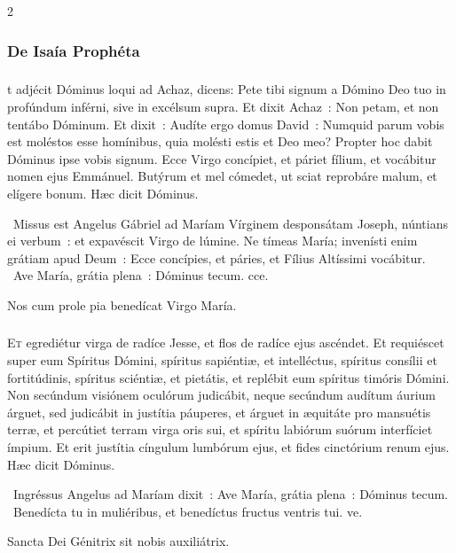 \documentclass[9pt,twoside]{extarticle}
\begin{document}
\begin{multicols}{2}
{{\subsubsection*{\center De Isaía Prophéta}
\subsubsection*{\center {}}
t adjécit Dóminus loqui ad Achaz, dicens:
Pete tibi signum a Dómino Deo tuo in profúndum inférni, sive in excélsum supra.
Et dixit Achaz~: Non petam, et non tentábo Dóminum.
Et dixit~: Audíte ergo domus David~: Numquid parum vobis est moléstos esse homínibus, quia molésti estis et Deo meo?
Propter hoc dabit Dóminus ipse vobis signum. Ecce Virgo concípiet, et páriet fílium, et vocábitur nomen ejus Emmánuel.
Butýrum et mel cómedet, ut sciat reprobáre malum, et elígere bonum. Hæc dicit Dóminus.

\begin{tightlist}{}
\item {}~Missus est Angelus Gábriel ad Maríam Vírginem desponsátam Joseph, núntians ei verbum~: et expavéscit Virgo de lúmine. Ne tímeas María; invenísti enim grátiam apud Deum~: \textred{*} Ecce concípies, et páries, et Fílius Altíssimi vocábitur.  ~Ave María, grátia plena~: Dóminus tecum. cce.
\item {\small {} Nos cum prole pia benedícat Virgo María.}
\end{tightlist}

\subsubsection*{}
\lettrine{E}t egrediétur virga de radíce Jesse, et flos de radíce ejus ascéndet.
Et requiéscet super eum Spíritus Dómini, spíritus sapiéntiæ, et intelléctus, spíritus consílii et fortitúdinis, spíritus sciéntiæ, et pietátis,
et replébit eum spíritus timóris Dómini. Non secúndum visiónem oculórum judicábit, neque secúndum audítum áurium árguet,
sed judicábit in justítia páuperes, et árguet in æquitáte pro mansuétis terræ, et percútiet terram virga oris sui, et spíritu labiórum suórum interfíciet ímpium.
Et erit justítia cíngulum lumbórum ejus, et fides cinctórium renum ejus.
Hæc dicit Dóminus.

\begin{tightlist}{}
\item {}~Ingréssus Angelus ad Maríam dixit~: \textred{*} Ave María, grátia plena~: Dóminus tecum. ~Benedícta tu in muliéribus, et benedíctus fructus ventris tui. ve.
\item {\small {} Sancta Dei Génitrix sit nobis auxiliátrix.}
\end{tightlist}

}}
\end{multicols}
\end{document}

